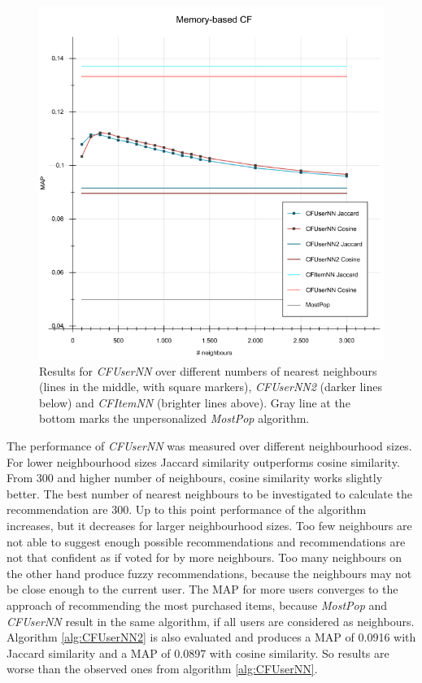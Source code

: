 \documentclass[10pt]{reportMaster}
\begin{document}
\begin{figure}[h!]
	\centering
	\includegraphics[width=1\textwidth]{figures/experiments/MemoryBasedCF}
	\caption[Results for memory-based collaborative filtering algorithms]{Results for \textit{CFUserNN} over different numbers of nearest neighbours (lines in the middle, with square markers), \textit{CFUserNN2} (darker lines below) and \textit{CFItemNN} (brighter lines above). Gray line at the bottom marks the unpersonalized \textit{MostPop} algorithm.}
	\label{fig:memBasedCF}
\end{figure}

The performance of \textit{CFUserNN} was measured over different neighbourhood sizes.
For lower neighbourhood sizes Jaccard similarity outperforms cosine similarity.
From 300 and higher number of neighbours, cosine similarity works slightly better.
The best number of nearest neighbours to be investigated to calculate the recommendation are 300.
Up to this point performance of the algorithm increases, but it decreases for larger neighbourhood sizes.
Too few neighbours are not able to suggest enough possible recommendations and recommendations are not that confident as if voted for by more neighbours.
Too many neighbours on the other hand produce fuzzy recommendations, because the neighbours may not be close enough to the current user.
The MAP for more users converges to the approach of recommending the most purchased items, because \textit{MostPop} and \textit{CFUserNN} result in the same algorithm, if all users are considered as neighbours.
Algorithm \ref{alg:CFUserNN2} is also evaluated and produces a MAP of 0.0916 with Jaccard similarity and a MAP of 0.0897 with cosine similarity.
So results are worse than the observed ones from algorithm \ref{alg:CFUserNN}.
\end{document}

